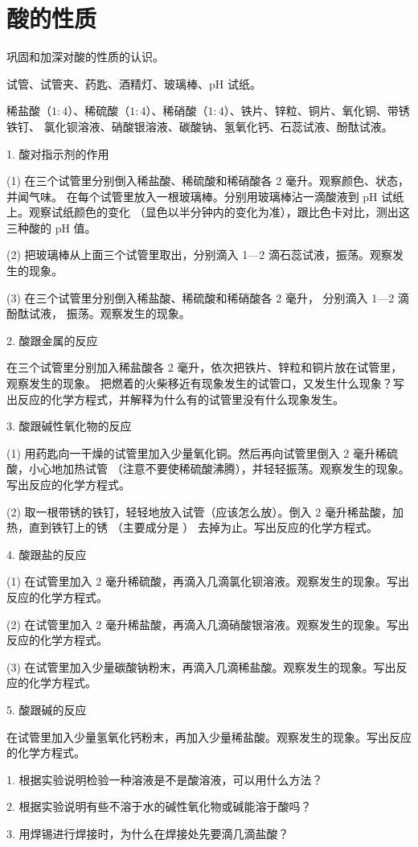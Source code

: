 \section{酸的性质}\label{sec:xssy-sy7}

\begin{shiyanmudi}
    巩固和加深对酸的性质的认识。
\end{shiyanmudi}


\begin{shiyanyongpin}
    试管、试管夹、药匙、酒精灯、玻璃棒、pH 试纸。

    稀盐酸（$1:4$）、稀硫酸（$1:4$）、稀硝酸（$1:4$）、铁片、锌粒、铜片、氧化铜、带锈铁钉、
    氯化钡溶液、硝酸银溶液、碳酸钠、氢氧化钙、石蕊试液、酚酞试液。
\end{shiyanyongpin}


\begin{shiyanbuzhou}
    1. 酸对指示剂的作用

    (1) 在三个试管里分别倒入稀盐酸、稀硫酸和稀硝酸各 2 毫升。观察颜色、状态，并闻气味。
    在每个试管里放入一根玻璃棒。分别用玻璃棒沾一滴酸液到 pH 试纸上。观察试纸颜色的变化
    （显色以半分钟内的变化为准），跟比色卡对比，测出这三种酸的 pH 值。

    (2) 把玻璃棒从上面三个试管里取出，分别滴入 1—2 滴石蕊试液，振荡。观察发生的现象。

    (3) 在三个试管里分别倒入稀盐酸、稀硫酸和稀硝酸各 2 毫升， 分别滴入 1—2 滴酚酞试液， 振荡。观察发生的现象。

    2. 酸跟金属的反应

    在三个试管里分别加入稀盐酸各 2 毫升，依次把铁片、锌粒和铜片放在试管里，观察发生的现象。
    把燃着的火柴移近有现象发生的试管口，又发生什么现象？写出反应的化学方程式，并解释为什么有的试管里没有什么现象发生。

    3. 酸跟碱性氧化物的反应

    (1) 用药匙向一干燥的试管里加入少量氧化铜。然后再向试管里倒入 2 毫升稀硫酸，小心地加热试管
    （注意不要使稀硫酸沸腾），并轻轻振荡。观察发生的现象。写出反应的化学方程式。

    (2) 取一根带锈的铁钉，轻轻地放入试管（应该怎么放）。倒入 2 毫升稀盐酸，加热，直到铁钉上的锈
    （主要成分是 ） 去掉为止。写出反应的化学方程式。

    4. 酸跟盐的反应

    (1) 在试管里加入 2 毫升稀硫酸，再滴入几滴氯化钡溶液。观察发生的现象。写出反应的化学方程式。

    (2) 在试管里加入 2 毫升稀盐酸，再滴入几滴硝酸银溶液。观察发生的现象。写出反应的化学方程式。

    (3) 在试管里加入少量碳酸钠粉末，再滴入几滴稀盐酸。观察发生的现象。写出反应的化学方程式。

    5. 酸跟碱的反应

    在试管里加入少量氢氧化钙粉末，再加入少量稀盐酸。观察发生的现象。写出反应的化学方程式。
\end{shiyanbuzhou}


\begin{wentihetaolun}
    1. 根据实验说明检验一种溶液是不是酸溶液，可以用什么方法？

    2. 根据实验说明有些不溶于水的碱性氧化物或碱能溶于酸吗？

    3. 用焊锡进行焊接时，为什么在焊接处先要滴几滴盐酸？
\end{wentihetaolun}

